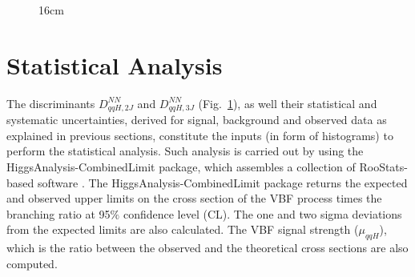 \begin{figure}[hbtp]{16cm}
	\label{fig:final_nn_shapes_prefit}
\end{figure}


\section{Statistical Analysis}
\label{subsec:statistical_analysis}
The discriminants $D_{qqH,2J}^{NN}$ and $D_{qqH,3J}^{NN}$ (Fig.~\ref{fig:final_nn_shapes_prefit}), as well their statistical and systematic uncertainties, derived for signal, background and observed data as explained in previous sections, constitute the inputs (in form of histograms) to perform the statistical analysis. Such analysis is carried out by using the HiggsAnalysis-CombinedLimit package, which assembles a collection of RooStats-based software \cite{bib:HiggsCombineToolWebPage,bib:PoS-ACAT2010-057}. The HiggsAnalysis-CombinedLimit package returns the expected and observed upper limits on the cross section of the VBF process times the branching ratio at 95$\%$ confidence level (CL). The one and two sigma deviations from the expected limits are also calculated. The VBF signal strength ($\mu_{qqH}$), which is the ratio between the observed and the theoretical cross sections are also computed.

